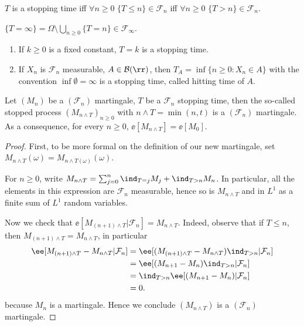 \documentclass[../main.tex]{subfiles}
\begin{document}
\begin{remark}
    $T$ is a stopping time iff $\forall n \geq 0$ $\{ T \leq n \} \in
    \mathcal{F}_n$ iff $\forall n \geq 0$ $\{ T > n \} \in \mathcal{F}_n $. 

    $\{ T = \infty \} = \Omega \setminus \bigcup_{n \geq 0} \{ T = n \} \in
    \mathcal{F}_{\infty}$.
\end{remark}

\newpage
\begin{example}
    \hfill
    \begin{enumerate}
      \item If $k \geq 0$ is a fixed constant, $T = k$ is a stopping time.
      \item If $X_n$ is $\mathcal{F}_n$ measurable, $A \in \mathcal{B}(\rr)$,
        then $T_A = \inf \{ n \geq 0 \colon X_n \in A \} $ with the convention
        $\inf \emptyset = \infty$ is a stopping time, called hitting time of
        $A$.
    \end{enumerate}
\end{example}

\begin{lemma}
  Let $(M_n)$ be a $(\mathcal{F}_n)$ martingale, $T$ be a $\mathcal{F}_n$
  stopping time, then the so-called stopped process $(M_{n \wedge T})_{n \geq
  0}$ with $n \wedge T = \min(n, t)$ is a $(\mathcal{F}_n)$ martingale. As a
  consequence, for every $n \geq 0$, $\ee[M_{n \wedge T}] = \ee[M_0]$.
\end{lemma}
\begin{proof}
    First, to be more formal on the definition of our new martingale, set $M_{n
    \wedge T}(\omega) = M_{n \wedge T(\omega)}(\omega)$.

    For $n \geq 0$, write $M_{n \wedge T} = \sum_{j=0}^n \ind_{T = j} M_j +
    \ind_{T > n}M_n$. In particular, all the elements in this expression are
    $\mathcal{F}_n$ measurable, hence so is $M_{n \wedge T}$ and in $L^1$ as a
    finite sum of $L^1$ random variables.

    Now we check that $\ee[M_{(n+1) \wedge T} | \mathcal{F}_n] =  M_{n \wedge
    T}$. Indeed, observe that if $T \leq n$, then $M_{(n+1)\wedge T} = M_{n
    \wedge T}$, in particular
    \begin{align*}
      \ee[M_{(n+1)\wedge T} - M_{n \wedge T} | \mathcal{F}_n]
      &= \ee[(M_{(n+1)\wedge T} - M_{n \wedge T})\ind_{T > n} | \mathcal{F}_n]
      \\
      &= \ee[(M_{n+1} - M_{n})\ind_{T > n} | \mathcal{F}_n] \\
      &= \ind_{T > n}\ee[(M_{n+1} - M_{n})| \mathcal{F}_n]  \\
      &= 0
    .\end{align*} 
    because $M_n$ is a martingale. Hence we conclude $(M_{n \wedge T})$ is a
    $(\mathcal{F}_n)$ martingale.
\end{proof}
\end{document}
